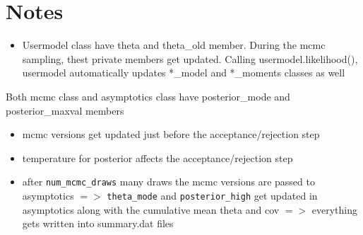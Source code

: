\documentclass[11pt, letterpaper, notitlepage]{article}
\begin{document}
\pagebreak


\section*{Notes}

\begin{itemize}
\item Usermodel class have theta and theta\_old member. During the mcmc sampling, thest private members get updated. Calling usermodel.likelihood(), usermodel automatically updates *\_model and *\_moments classes as well
\end{itemize}

Both mcmc class and asymptotics class have posterior\_mode and posterior\_maxval members
\begin{itemize}
\item mcmc versions get updated just before the acceptance/rejection step 
\item temperature for posterior affects the acceptance/rejection step 
\item after \texttt{num\_mcmc\_draws} many draws the mcmc versions are passed to asymptotics $=>$ \texttt{theta\_mode} and \texttt{posterior\_high} get updated in asymptotics along with the cumulative mean theta and cov $=>$ everything gets written into summary.dat files 
\end{itemize}


\newpage
\appendix
\vspace{48pt}


\end{document}
